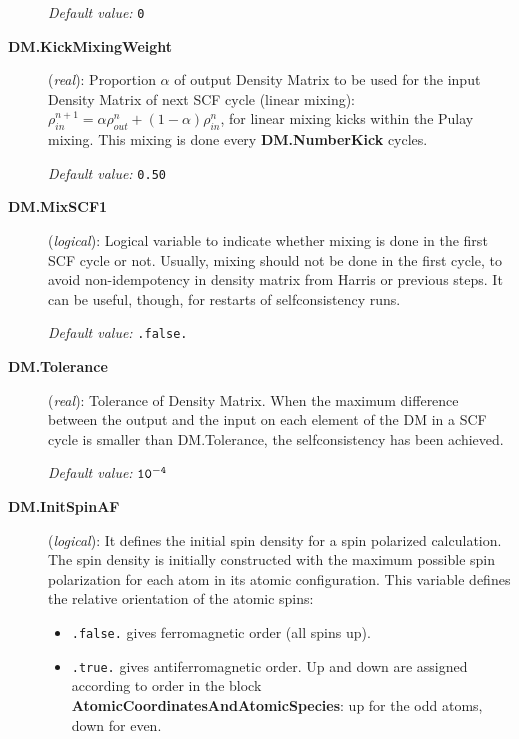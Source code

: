 \begin{description}
{\it Default value:} {\tt 0}

\item[{\bf DM.KickMixingWeight}] ({\it real}):
Proportion $\alpha$ of 
output Density Matrix to be used for the input Density Matrix of 
next SCF cycle (linear mixing):
$\rho^{n+1}_{in} = \alpha \rho^{n}_{out} 
+(1 - \alpha) \rho^{n}_{in}$, for linear mixing kicks within the
Pulay mixing. This mixing is done every {\bf DM.NumberKick} cycles.

{\it Default value:} {\tt 0.50}



\item[{\bf DM.MixSCF1}] ({\it logical}):
Logical variable to indicate whether mixing is done in the
first SCF cycle or not. Usually, mixing should not be done in
the first cycle, to avoid non-idempotency in density matrix
from Harris or previous steps. It can be useful, though,
for restarts of selfconsistency runs.

{\it Default value:} {\tt .false.}



\item[{\bf DM.Tolerance}] ({\it real}): 
Tolerance of Density Matrix.
When the maximum difference between the output and the
input on each element of the DM 
in a SCF cycle is smaller than DM.Tolerance,
the selfconsistency has been achieved.

{\it Default value:} {${\tt 10^{-4}}$}

\item[{\bf DM.InitSpinAF}] ({\it logical}):
It defines the initial spin density for a spin polarized calculation. 
The spin density is initially constructed with the maximum possible
spin polarization for each atom in its atomic configuration.
This variable defines the relative orientation of the atomic
spins: 

\begin{itemize}
\item {\tt .false.} gives ferromagnetic order (all spins up).
\item {\tt .true.} gives antiferromagnetic order. Up and down are
assigned according to order in the block 
{\bf AtomicCoordinatesAndAtomicSpecies}: up for the odd atoms, down for even.
\end{itemize}


\end{description}
